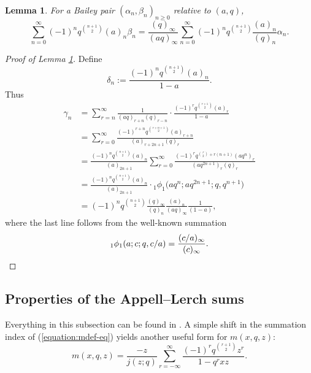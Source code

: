 \documentclass[12pt,reqno]{amsart}
\newtheorem{lemma}[theorem]{Lemma}
\theoremstyle{remark}
\theoremstyle{definition}
\numberwithin{theorem}{section} \numberwithin{equation}{section}
\numberwithin{example}{section}
\begin{document}
\begin{lemma}\label{lemma:important-lemma}  For a Bailey pair $(\alpha_n,\beta_n)_{n\ge 0}$ relative to $(a,q)$,
\begin{equation}
\sum_{n=0}^{\infty}(-1)^nq^{\binom{n+1}{2}}(a)_n\beta_n=\frac{(q)_{\infty}}{(aq)_{\infty}}\sum_{n=0}^{\infty}(-1)^nq^{\binom{n+1}{2}}\frac{(a)_n}{(q)_n}\alpha_n.\label{equation:important-id}
\end{equation}
\end{lemma}
\begin{proof}[Proof of Lemma \ref{lemma:important-lemma}]
Define
\begin{equation}
\delta_n:=\frac{(-1)^nq^{\binom{n+1}{2}}(a)_n}{1-a}.
\end{equation}
Thus
{\allowdisplaybreaks \begin{align*}
\gamma_n&=\sum_{r=n}^{\infty}\frac{1}{(aq)_{r+n}(q)_{r-n}}\cdot \frac{(-1)^rq^{\binom{r+1}{2}}(a)_r}{1-a}\\
&=\sum_{r=0}^{\infty}\frac{(-1)^{r+n}q^{\binom{r+n+1}{2}}(a)_{r+n}}{(a)_{r+2n+1}(q)_{r}}\\
&=\frac{(-1)^nq^{\binom{n+1}{2}}(a)_n}{(a)_{2n+1}}\sum_{r=0}^{\infty}\frac{(-1)^{r}q^{\binom{r}{2}+r(n+1)}(aq^{n})_{r}}{(aq^{2n+1})_{r}(q)_{r}}\\
&=\frac{(-1)^nq^{\binom{n+1}{2}}(a)_n}{(a)_{2n+1}}\cdot{}_1\phi_1\big ( aq^{n};aq^{2n+1};q,q^{n+1}\big )\\
&=(-1)^nq^{\binom{n+1}{2}}\frac{(q)_{\infty}}{(q)_n}\frac{(a)_n}{(aq)_{\infty}}\frac{1}{(1-a)},
\end{align*}}where the last line follows from the well-known summation
\begin{equation*}
{}_1\phi_1(a;c;q,c/a)=\frac{(c/a)_{\infty}}{(c)_{\infty}}.\qedhere
\end{equation*}
\end{proof}

\subsection{Properties of the Appell--Lerch sums}\label{section:prop-mxqz}
Everything in this subsection can be found in \cite{HM}.   A simple shift in the summation index of (\ref{equation:mdef-eq}) yields another useful form for $m(x,q,z)$:
\begin{equation}
m(x,q,z)=\frac{-z}{j(z;q)}\sum_{r=-\infty}^{\infty}\frac{(-1)^rq^{\binom{r+1}{2}}z^r}{1-q^{r}xz}.\label{equation:alt-mdef-eq}
\end{equation}
\end{document}
